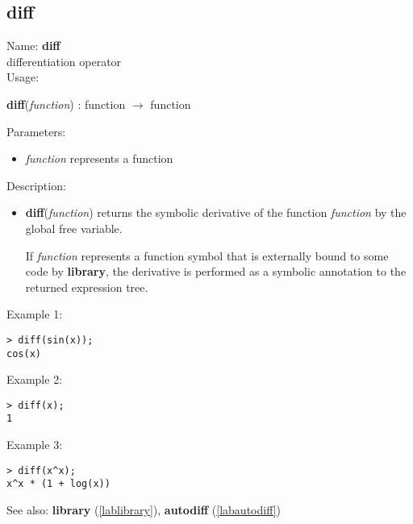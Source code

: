 \subsection{diff}
\label{labdiff}
\noindent Name: \textbf{diff}\\
differentiation operator\\
\noindent Usage: 
\begin{center}
\textbf{diff}(\emph{function}) : \textsf{function} $\rightarrow$ \textsf{function}\\
\end{center}
Parameters: 
\begin{itemize}
\item \emph{function} represents a function
\end{itemize}
\noindent Description: \begin{itemize}

\item \textbf{diff}(\emph{function}) returns the symbolic derivative of the function
   \emph{function} by the global free variable.
    
   If \emph{function} represents a function symbol that is externally bound
   to some code by \textbf{library}, the derivative is performed as a symbolic
   annotation to the returned expression tree.
\end{itemize}
\noindent Example 1: 
\begin{center}\begin{minipage}{15cm}\begin{Verbatim}[frame=single]
> diff(sin(x));
cos(x)
\end{Verbatim}
\end{minipage}\end{center}
\noindent Example 2: 
\begin{center}\begin{minipage}{15cm}\begin{Verbatim}[frame=single]
> diff(x);
1
\end{Verbatim}
\end{minipage}\end{center}
\noindent Example 3: 
\begin{center}\begin{minipage}{15cm}\begin{Verbatim}[frame=single]
> diff(x^x);
x^x * (1 + log(x))
\end{Verbatim}
\end{minipage}\end{center}
See also: \textbf{library} (\ref{lablibrary}), \textbf{autodiff} (\ref{labautodiff})
